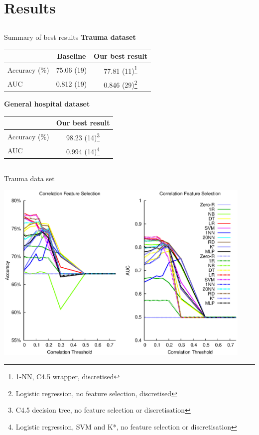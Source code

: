 \documentclass[compress]{beamer}
\begin{document}
\section{Results}
\subsection{}
\begin{frame}{Summary of best results}
\textbf{Trauma dataset}
\begin{center}
\begin{tabular}{l|cc}
 & Baseline & Our best result \\
\hline
Accuracy (\%) & 75.06 (19) & \textcolor{emerald}{77.81} (\textcolor{emerald}{11})\footnote{1-NN, C4.5 wrapper, discretised} \\
AUC & 0.812 (19) & \textcolor{emerald}{0.846} (\textcolor{sydneyred}{29})\footnote{Logistic regression, no feature selection, discretised} \\
\end{tabular}
\end{center}

\pause
\textbf{General hospital dataset}
\begin{center}
\begin{tabular}{l|c}
 & Our best result \\
\hline
Accuracy (\%) & 98.23 (14)\footnote{C4.5 decision tree, no feature selection or discretisation} \\
AUC & 0.994 (14)\footnote{Logistic regression, SVM and K*, no feature selection or discretisation} \\
\end{tabular}
\end{center}
\end{frame}

\subsection{}
\begin{frame}{Trauma data set}
\begin{center}
\includegraphics[width=0.93\textwidth]{tr-corr.eps}
\end{center}
\end{frame}
\end{document}
